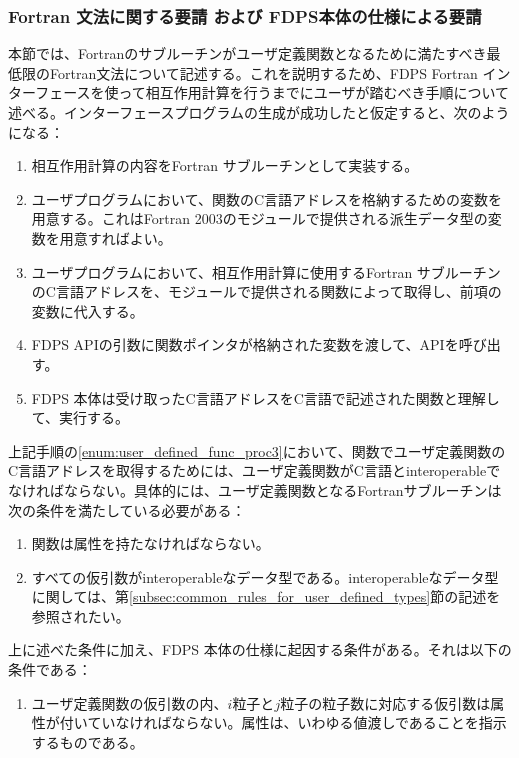 \subsubsection{Fortran 文法に関する要請 および FDPS本体の仕様による要請}
\label{s2sec:requirements_for_ftn_grammer_for_udt_func}
本節では、Fortranのサブルーチンがユーザ定義関数となるために満たすべき最低限のFortran文法について記述する。これを説明するため、FDPS Fortran インターフェースを使って相互作用計算を行うまでにユーザが踏むべき手順について述べる。インターフェースプログラムの生成が成功したと仮定すると、次のようになる：
\begin{enumerate}[leftmargin=*,itemsep=-1ex,label=(\Roman*)]
\item 相互作用計算の内容をFortran サブルーチンとして実装する。
\item ユーザプログラムにおいて、関数のC言語アドレスを格納するための変数を用意する。これはFortran 2003のモジュールで提供される派生データ型の変数を用意すればよい。
\item ユーザプログラムにおいて、相互作用計算に使用するFortran サブルーチンのC言語アドレスを、モジュールで提供される関数によって取得し、前項の変数に代入する。\label{enum:user_defined_func_proc3}
\item FDPS APIの引数に関数ポインタが格納された変数を渡して、APIを呼び出す。
\item FDPS 本体は受け取ったC言語アドレスをC言語で記述された関数と理解して、実行する。
\end{enumerate}
上記手順の\ref{enum:user_defined_func_proc3}において、関数でユーザ定義関数のC言語アドレスを取得するためには、ユーザ定義関数がC言語とinteroperableでなければならない。具体的には、ユーザ定義関数となるFortranサブルーチンは次の条件を満たしている必要がある：
\begin{enumerate}[leftmargin=*,itemsep=-1ex,label=(\arabic*)]
\item 関数は属性を持たなければならない。
\item すべての仮引数がinteroperableなデータ型である。interoperableなデータ型に関しては、第\ref{subsec:common_rules_for_user_defined_types}節の記述を参照されたい。
\end{enumerate}

上に述べた条件に加え、FDPS 本体の仕様に起因する条件がある。それは以下の条件である：
\begin{enumerate}[leftmargin=*,itemsep=-1ex,label=(\arabic*),resume]
\item ユーザ定義関数の仮引数の内、$i$粒子と$j$粒子の粒子数に対応する仮引数は属性が付いていなければならない。属性は、いわゆる値渡しであることを指示するものである。 
\end{enumerate}

